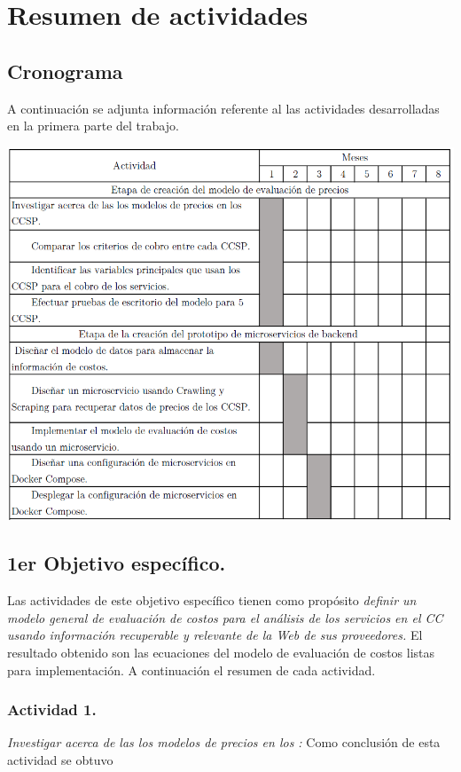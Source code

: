 
\chapter{Resumen de actividades} %

\label{ch:metodologia} %
\section{Cronograma}
A continuación se adjunta información referente al las actividades desarrolladas en la primera parte del trabajo.
\begin{center}
    \includegraphics[width=\textwidth]{gfx/actividades.png}
\end{center}

\section{1er Objetivo específico.}
Las actividades de este objetivo específico tienen como propósito \emph{definir un modelo general de evaluación de costos para el análisis de los servicios en el \acrshort{CC} usando información recuperable y relevante de la Web de sus proveedores.} El resultado obtenido son las ecuaciones del modelo de evaluación de costos listas para implementación. A continuación el resumen de cada actividad.

\subsection{Actividad 1.}
\emph{Investigar acerca de las los modelos de precios en los :} \newline\newline
Como conclusión de esta actividad se obtuvo

